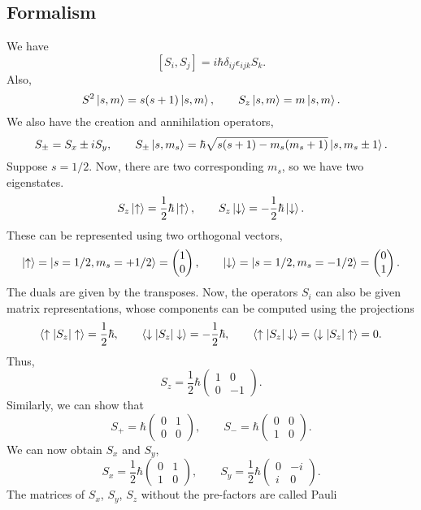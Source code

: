 \documentclass[11pt]{article}
\theoremstyle{definition}
\theoremstyle{remark}
\numberwithin{equation}{section}
\begin{document}
    \subsection{Formalism}
    We have \[
        [S_i, S_j] = i\hbar \delta_{ij}\epsilon_{ijk}S_k.
    \] Also, \[
        S^2\ket{s, m} = s(s + 1)\ket{s, m}, \qquad S_z\ket{s, m} = m\ket{s, m}.
    \] We also have the creation and annihilation operators, \[
        S_\pm = S_x \pm iS_y, \qquad
        S_\pm\ket{s, m_s} = \hbar\sqrt{s(s + 1) - m_s(m_s + 1)}\ket{s, m_s \pm 1}.
    \] Suppose $s = 1 /2$. Now, there are two corresponding $m_s$, so we have two
    eigenstates. \[
        S_z\ket{\uparrow} = \frac{1}{2}\hbar \ket{\uparrow}, \qquad
        S_z\ket{\downarrow} = -\frac{1}{2}\hbar \ket{\downarrow}.
    \] These can be represented using two orthogonal vectors, \[
        \ket{\uparrow} = \ket{s = 1 /2, m_s = +1 / 2} = \begin{pmatrix}
            1\\0
        \end{pmatrix},\qquad
        \ket{\downarrow} = \ket{s = 1 /2, m_s = -1 / 2} = \begin{pmatrix}
            0\\1
        \end{pmatrix}.
    \] The duals are given by the transposes. Now, the operators $S_i$ can also be
    given matrix representations, whose components can be computed using the
    projections \[
        \braket{\uparrow|S_z|\uparrow} = \frac{1}{2}\hbar, \qquad
        \braket{\downarrow|S_z|\downarrow} = -\frac{1}{2}\hbar, \qquad
        \braket{\uparrow|S_z|\downarrow} = \braket{\downarrow|S_z|\uparrow} = 0.
    \] Thus, \[
        S_z = \frac{1}{2}\hbar \begin{pmatrix}
            1 & 0 \\ 0 & -1
        \end{pmatrix}.
    \] Similarly, we can show that \[
        S_+ = \hbar \begin{pmatrix}
            0 & 1 \\ 0 & 0
        \end{pmatrix}, \qquad
        S_- = \hbar \begin{pmatrix}
            0 & 0 \\ 1 & 0
        \end{pmatrix}.
    \] We can now obtain $S_x$ and $S_y$, \[
        S_x = \frac{1}{2}\hbar \begin{pmatrix}
            0 & 1 \\ 1 & 0
        \end{pmatrix}, \qquad
        S_y = \frac{1}{2}\hbar \begin{pmatrix}
            0 & -i \\ i & 0
        \end{pmatrix}.
    \] The matrices of $S_x$, $S_y$, $S_z$ without the pre-factors are called Pauli
\end{document}
